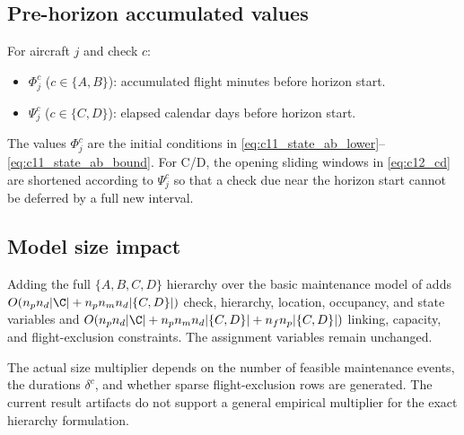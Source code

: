 \subsection{Pre-horizon accumulated values}

For aircraft $j$ and check $c$:
\begin{itemize}
  \item $\Phi^c_j$ ($c \in \{A,B\}$): accumulated flight minutes before
    horizon start.
  \item $\Psi^c_j$ ($c \in \{C,D\}$): elapsed calendar days before horizon
    start.
\end{itemize}
The values $\Phi^c_j$ are the initial conditions in
\eqref{eq:c11_state_ab_lower}--\eqref{eq:c11_state_ab_bound}. For C/D, the
opening sliding windows in \eqref{eq:c12_cd} are shortened according to
$\Psi^c_j$ so that a check due near the horizon start cannot be deferred by a
full new interval.

\subsection{Model size impact}

\begin{proposition}
  Adding the full $\{A,B,C,D\}$ hierarchy over the basic maintenance model of
   adds $O(n_pn_d|\C|+n_pn_mn_d|\{C,D\}|)$ check,
  hierarchy, location, occupancy, and state variables and
  $O(n_pn_d|\C|+n_pn_mn_d|\{C,D\}|+n_fn_p|\{C,D\}|)$ linking, capacity, and
  flight-exclusion constraints. The assignment variables remain unchanged.
\end{proposition}

The actual size multiplier depends on the number of feasible maintenance
events, the durations $\delta^c$, and whether sparse flight-exclusion rows are
generated. The current result artifacts do not support a general empirical
multiplier for the exact hierarchy formulation.
